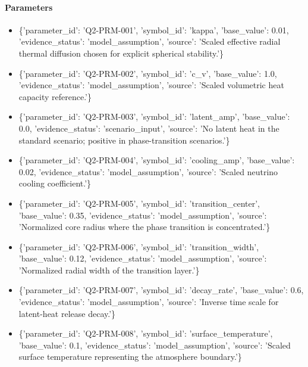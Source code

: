 \documentclass[11pt]{article}
\begin{document}
\paragraph{Parameters}
\begin{itemize}\raggedright
\item \{'parameter\_\allowbreak{}id': 'Q2-PRM-001', 'symbol\_\allowbreak{}id': 'kappa', 'base\_\allowbreak{}value': 0.01, 'evidence\_\allowbreak{}status': 'model\_\allowbreak{}assumption', 'source': 'Scaled effective radial thermal diffusion chosen for explicit spherical stability.'\}
\item \{'parameter\_\allowbreak{}id': 'Q2-PRM-002', 'symbol\_\allowbreak{}id': 'c\_\allowbreak{}v', 'base\_\allowbreak{}value': 1.0, 'evidence\_\allowbreak{}status': 'model\_\allowbreak{}assumption', 'source': 'Scaled volumetric heat capacity reference.'\}
\item \{'parameter\_\allowbreak{}id': 'Q2-PRM-003', 'symbol\_\allowbreak{}id': 'latent\_\allowbreak{}amp', 'base\_\allowbreak{}value': 0.0, 'evidence\_\allowbreak{}status': 'scenario\_\allowbreak{}input', 'source': 'No latent heat in the standard scenario; positive in phase-transition scenarios.'\}
\item \{'parameter\_\allowbreak{}id': 'Q2-PRM-004', 'symbol\_\allowbreak{}id': 'cooling\_\allowbreak{}amp', 'base\_\allowbreak{}value': 0.02, 'evidence\_\allowbreak{}status': 'model\_\allowbreak{}assumption', 'source': 'Scaled neutrino cooling coefficient.'\}
\item \{'parameter\_\allowbreak{}id': 'Q2-PRM-005', 'symbol\_\allowbreak{}id': 'transition\_\allowbreak{}center', 'base\_\allowbreak{}value': 0.35, 'evidence\_\allowbreak{}status': 'model\_\allowbreak{}assumption', 'source': 'Normalized core radius where the phase transition is concentrated.'\}
\item \{'parameter\_\allowbreak{}id': 'Q2-PRM-006', 'symbol\_\allowbreak{}id': 'transition\_\allowbreak{}width', 'base\_\allowbreak{}value': 0.12, 'evidence\_\allowbreak{}status': 'model\_\allowbreak{}assumption', 'source': 'Normalized radial width of the transition layer.'\}
\item \{'parameter\_\allowbreak{}id': 'Q2-PRM-007', 'symbol\_\allowbreak{}id': 'decay\_\allowbreak{}rate', 'base\_\allowbreak{}value': 0.6, 'evidence\_\allowbreak{}status': 'model\_\allowbreak{}assumption', 'source': 'Inverse time scale for latent-heat release decay.'\}
\item \{'parameter\_\allowbreak{}id': 'Q2-PRM-008', 'symbol\_\allowbreak{}id': 'surface\_\allowbreak{}temperature', 'base\_\allowbreak{}value': 0.1, 'evidence\_\allowbreak{}status': 'model\_\allowbreak{}assumption', 'source': 'Scaled surface temperature representing the atmosphere boundary.'\}
\end{itemize}
\end{document}
